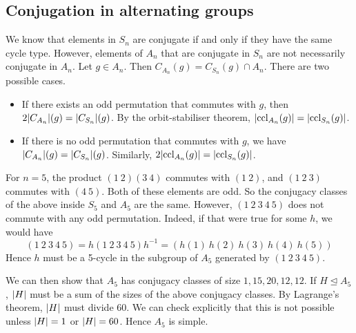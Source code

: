 \subsection{Conjugation in alternating groups}
We know that elements in \( S_n \) are conjugate if and only if they have the same cycle type.
However, elements of \( A_n \) that are conjugate in \( S_n \) are not necessarily conjugate in \( A_n \).
Let \( g \in A_n \).
Then \( C_{A_n}(g) = C_{S_n}(g) \cap A_n \).
There are two possible cases.
\begin{itemize}
	\item If there exists an odd permutation that commutes with \( g \), then \( 2\abs{C_{A_n}}(g) = \abs{C_{S_n}}(g) \).
		By the orbit-stabiliser theorem, \( \abs{\operatorname{ccl}_{A_n}(g)} = \abs{\operatorname{ccl}_{S_n}(g)} \).
	\item If there is no odd permutation that commutes with \( g \), we have \( \abs{C_{A_n}}(g) = \abs{C_{S_n}}(g) \).
		Similarly, \( 2\abs{\operatorname{ccl}_{A_n}(g)} = \abs{\operatorname{ccl}_{S_n}(g)} \).
\end{itemize}
\begin{example}
	For \( n = 5 \), the product \( (1\ 2)(3\ 4) \) commutes with \( (1\ 2) \), and \( (1\ 2\ 3) \) commutes with \( (4\ 5) \).
	Both of these elements are odd.
	So the conjugacy classes of the above inside \( S_5 \) and \( A_5 \) are the same.
	However, \( (1\ 2\ 3\ 4\ 5) \) does not commute with any odd permutation.
	Indeed, if that were true for some \( h \), we would have
	\[ (1\ 2\ 3\ 4\ 5) = h (1\ 2\ 3\ 4\ 5) h^{-1} = (h(1)\ h(2)\ h(3)\ h(4)\ h(5)) \]
	Hence \( h \) must be a 5-cycle in the subgroup of \( A_5 \) generated by \( (1\ 2\ 3\ 4\ 5) \).

	We can then show that \( A_5 \) has conjugacy classes of size \( 1, 15, 20, 12, 12 \).
	If \( H \trianglelefteq A_5 \), \( \abs{H} \) must be a sum of the sizes of the above conjugacy classes.
	By Lagrange's theorem, \( \abs{H} \) must divide 60.
	We can check explicitly that this is not possible unless \( \abs{H} = 1 \) or \( \abs{H} = 60 \).
	Hence \( A_5 \) is simple.
\end{example}

